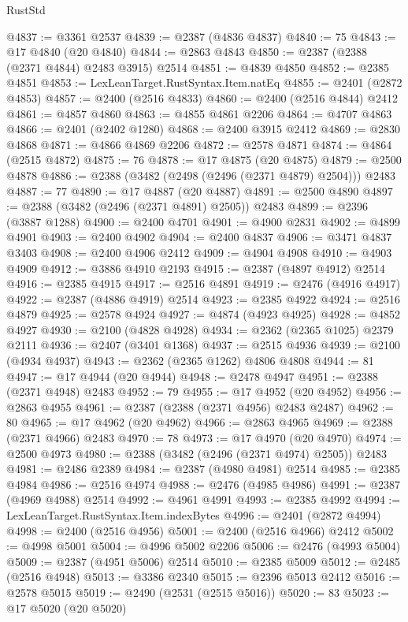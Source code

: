 \begin{lexlean}{RustStd}
\begin{coremodule}
@4837 := @3361 @2537
@4839 := @2387 (@4836 @4837)
@4840 := 75
@4843 := @17 @4840 (@20 @4840)
@4844 := @2863 @4843
@4850 := @2387 (@2388 (@2371 @4844) @2483 @3915) @2514
@4851 := @4839 @4850
@4852 := @2385 @4851
@4853 := LexLeanTarget.RustSyntax.Item.natEq
@4855 := @2401 (@2872 @4853)
@4857 := @2400 (@2516 @4833)
@4860 := @2400 (@2516 @4844) @2412
@4861 := @4857 @4860
@4863 := @4855 @4861 @2206
@4864 := @4707 @4863
@4866 := @2401 (@2402 @1280)
@4868 := @2400 @3915 @2412
@4869 := @2830 @4868
@4871 := @4866 @4869 @2206
@4872 := @2578 @4871
@4874 := @4864 (@2515 @4872)
@4875 := 76
@4878 := @17 @4875 (@20 @4875)
@4879 := @2500 @4878
@4886 := @2388 (@3482 (@2498 (@2496 (@2371 @4879) @2504))) @2483
@4887 := 77
@4890 := @17 @4887 (@20 @4887)
@4891 := @2500 @4890
@4897 := @2388 (@3482 (@2496 (@2371 @4891) @2505)) @2483
@4899 := @2396 (@3887 @1288)
@4900 := @2400 @4701
@4901 := @4900 @2831
@4902 := @4899 @4901
@4903 := @2400 @4902
@4904 := @2400 @4837
@4906 := @3471 @4837 @3403
@4908 := @2400 @4906 @2412
@4909 := @4904 @4908
@4910 := @4903 @4909
@4912 := @3886 @4910 @2193
@4915 := @2387 (@4897 @4912) @2514
@4916 := @2385 @4915
@4917 := @2516 @4891
@4919 := @2476 (@4916 @4917)
@4922 := @2387 (@4886 @4919) @2514
@4923 := @2385 @4922
@4924 := @2516 @4879
@4925 := @2578 @4924
@4927 := @4874 (@4923 @4925)
@4928 := @4852 @4927
@4930 := @2100 (@4828 @4928)
@4934 := @2362 (@2365 @1025) @2379 @2111
@4936 := @2407 (@3401 @1368)
@4937 := @2515 @4936
@4939 := @2100 (@4934 @4937)
@4943 := @2362 (@2365 @1262) @4806 @4808
@4944 := 81
@4947 := @17 @4944 (@20 @4944)
@4948 := @2478 @4947
@4951 := @2388 (@2371 @4948) @2483
@4952 := 79
@4955 := @17 @4952 (@20 @4952)
@4956 := @2863 @4955
@4961 := @2387 (@2388 (@2371 @4956) @2483 @2487)
@4962 := 80
@4965 := @17 @4962 (@20 @4962)
@4966 := @2863 @4965
@4969 := @2388 (@2371 @4966) @2483
@4970 := 78
@4973 := @17 @4970 (@20 @4970)
@4974 := @2500 @4973
@4980 := @2388 (@3482 (@2496 (@2371 @4974) @2505)) @2483
@4981 := @2486 @2389
@4984 := @2387 (@4980 @4981) @2514
@4985 := @2385 @4984
@4986 := @2516 @4974
@4988 := @2476 (@4985 @4986)
@4991 := @2387 (@4969 @4988) @2514
@4992 := @4961 @4991
@4993 := @2385 @4992
@4994 := LexLeanTarget.RustSyntax.Item.indexBytes
@4996 := @2401 (@2872 @4994)
@4998 := @2400 (@2516 @4956)
@5001 := @2400 (@2516 @4966) @2412
@5002 := @4998 @5001
@5004 := @4996 @5002 @2206
@5006 := @2476 (@4993 @5004)
@5009 := @2387 (@4951 @5006) @2514
@5010 := @2385 @5009
@5012 := @2485 (@2516 @4948)
@5013 := @3386 @2340
@5015 := @2396 @5013 @2412
@5016 := @2578 @5015
@5019 := @2490 (@2531 (@2515 @5016))
@5020 := 83
@5023 := @17 @5020 (@20 @5020)

\end{coremodule}
\end{lexlean}
